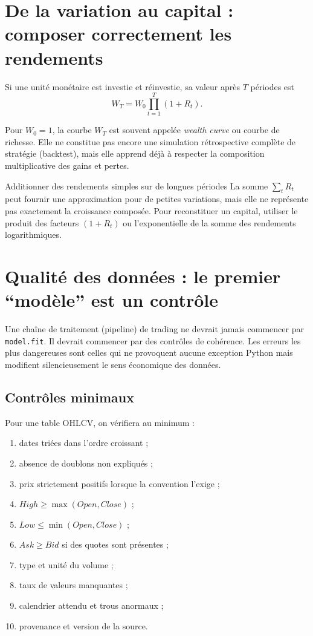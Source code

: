 \section{De la variation au capital : composer correctement les rendements}

Si une unité monétaire est investie et réinvestie, sa valeur après $T$ périodes est
\[
W_T=W_0\prod_{t=1}^{T}(1+R_t).
\]

Pour $W_0=1$, la courbe $W_T$ est souvent appelée \emph{wealth curve} ou courbe de richesse. Elle ne constitue pas encore une simulation rétrospective complète de stratégie (backtest), mais elle apprend déjà à respecter la composition multiplicative des gains et pertes.


\begin{attentionbox}{Additionner des rendements simples sur de longues périodes}
La somme $\sum_t R_t$ peut fournir une approximation pour de petites variations, mais elle ne représente pas exactement la croissance composée. Pour reconstituer un capital, utiliser le produit des facteurs $(1+R_t)$ ou l'exponentielle de la somme des rendements logarithmiques.
\end{attentionbox}

\section{Qualité des données : le premier ``modèle'' est un contrôle}

Une chaîne de traitement (pipeline) de trading ne devrait jamais commencer par \texttt{model.fit}. Il devrait commencer par des contrôles de cohérence. Les erreurs les plus dangereuses sont celles qui ne provoquent aucune exception Python mais modifient silencieusement le sens économique des données.

\subsection{Contrôles minimaux}

Pour une table OHLCV, on vérifiera au minimum :
\begin{enumerate}
    \item dates triées dans l'ordre croissant ;
    \item absence de doublons non expliqués ;
    \item prix strictement positifs lorsque la convention l'exige ;
    \item $High\geq\max(Open,Close)$ ;
    \item $Low\leq\min(Open,Close)$ ;
    \item $Ask\geq Bid$ si des quotes sont présentes ;
    \item type et unité du volume ;
    \item taux de valeurs manquantes ;
    \item calendrier attendu et trous anormaux ;
    \item provenance et version de la source.
\end{enumerate}


